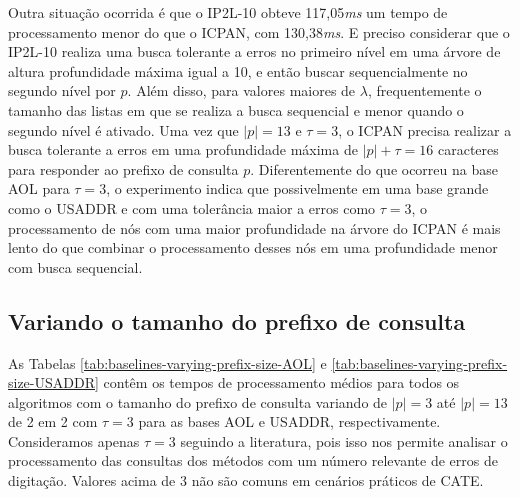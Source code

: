 Outra situação ocorrida é que o IP2L-10 obteve 117,05\textit{ms} um tempo de processamento menor do que o ICPAN, com 130,38\textit{ms}. E preciso considerar que o IP2L-10 realiza uma busca tolerante a erros no primeiro nível em uma árvore de altura profundidade máxima igual a 10, e então buscar sequencialmente no segundo nível por $p$. Além disso, para valores maiores de $\lambda$, frequentemente o tamanho das listas em que se realiza a busca sequencial e menor quando o segundo nível é ativado. Uma vez que $|p|=13$ e $\tau=3$, o ICPAN precisa realizar a busca tolerante a erros em uma profundidade máxima de $|p| + \tau = 16$ caracteres para responder ao prefixo de consulta $p$. Diferentemente do que ocorreu na base AOL para $\tau=3$, o experimento indica que possivelmente em uma base grande como o USADDR e com uma tolerância maior a erros como $\tau=3$, o processamento de nós com uma maior profundidade na árvore do ICPAN é mais lento do que combinar o processamento desses nós em uma profundidade menor com busca sequencial.


\subsection{Variando o tamanho do prefixo de consulta}

As Tabelas \ref{tab:baselines-varying-prefix-size-AOL} e \ref{tab:baselines-varying-prefix-size-USADDR} contêm os tempos de processamento médios para todos os algoritmos com o tamanho do prefixo de consulta variando de $|p|=3$ até $|p|=13$ de 2 em 2 com $\tau=3$ para as bases AOL e USADDR, respectivamente. Consideramos apenas $\tau=3$ seguindo a literatura, pois isso nos permite analisar o processamento das consultas dos métodos com um número relevante de erros de digitação. Valores acima de 3 não são comuns em cenários práticos de CATE.

